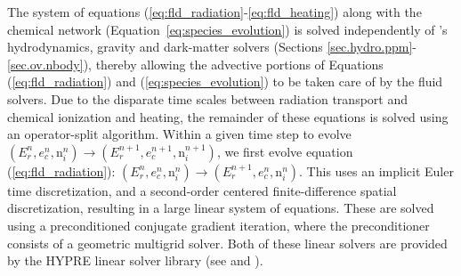 The system of equations
(\ref{eq:fld_radiation}-\ref{eq:fld_heating}) along with the chemical network 
(Equation~\ref{eq:species_evolution}) is solved
independently of \enzo's hydrodynamics, gravity and dark-matter solvers
(Sections \ref{sec.hydro.ppm}-\ref{sec.ov.nbody}), thereby allowing
the advective portions of Equations (\ref{eq:fld_radiation}) and
(\ref{eq:species_evolution}) to be taken care of by the fluid solvers.
Due to the disparate time scales between radiation transport and chemical
ionization and heating, the remainder of these equations is solved
using an operator-split algorithm.  Within a given time step to evolve
$(E_r^n, e_c^n, {\mathrm n}_i^n) \to (E_r^{n+1}, e_c^{n+1}, {\mathrm
n}_i^{n+1})$, we first evolve equation (\ref{eq:fld_radiation}):
$(E_r^n, e_c^n, {\mathrm n}_i^n) \to (E_r^{n+1}, e_c^{n}, {\mathrm
  n}_i^{n})$.  This uses an implicit Euler time discretization, and a
second-order centered finite-difference spatial discretization,
resulting in a large linear system of equations.  These are solved
using a preconditioned conjugate gradient iteration, where the
preconditioner consists of a geometric multigrid solver.  Both of
these linear solvers are provided by the HYPRE linear solver library
(see \cite{FalgoutYang2002} and \cite{hypre-manual}). 

